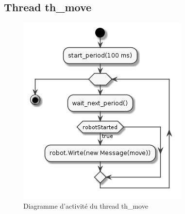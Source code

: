 \documentclass[11pt,a4paper]{paper}
\begin{document}
\subsection{Thread th\_move}
 \begin{figure}[htbp]
\begin{center}
\includegraphics[scale=0.4]{figures_pdf/activity/th_move}
\end{center}
\caption{Diagramme d'activité du thread th\_move}
\end{figure}
\FloatBarrier
\end{document}
